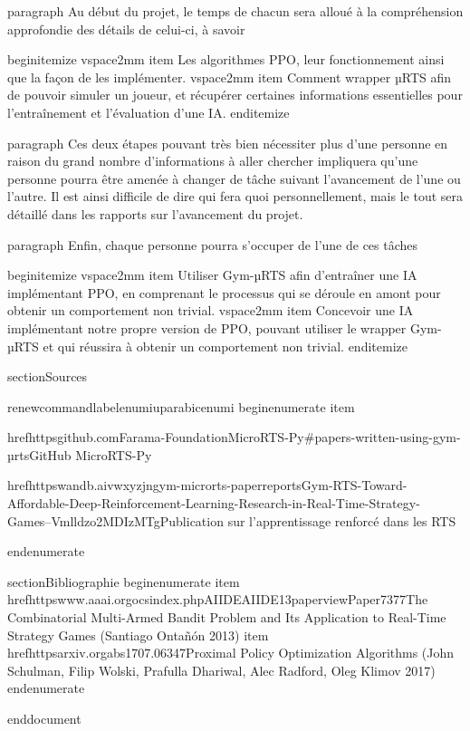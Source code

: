 	paragraph{}
	Au début du projet, le temps de chacun sera alloué à la compréhension approfondie des détails de celui-ci, à savoir 
	
	begin{itemize}
		vspace{2mm}
		item Les algorithmes PPO, leur fonctionnement ainsi que la façon de les implémenter.
		vspace{2mm}
		item Comment wrapper µRTS afin de pouvoir simuler un joueur, et récupérer certaines informations essentielles pour l'entraînement et l'évaluation d'une IA.
	end{itemize}
	
	paragraph{}
	Ces deux étapes pouvant très bien nécessiter plus d'une personne en raison du grand nombre d'informations à aller chercher impliquera qu'une personne pourra être amenée à changer de tâche suivant l'avancement de l'une ou l'autre. Il est ainsi difficile de dire qui fera quoi personnellement, mais le tout sera détaillé dans les rapports sur l'avancement du projet.
	
	paragraph{}
	Enfin, chaque personne pourra s'occuper de l'une de ces tâches 
	
	begin{itemize}
		vspace{2mm}
		item Utiliser Gym-µRTS afin d'entraîner une IA implémentant PPO, en comprenant le processus qui se déroule en amont pour obtenir un comportement non trivial.
		vspace{2mm}
		item Concevoir une IA implémentant notre propre version de PPO, pouvant utiliser le wrapper Gym-µRTS et qui réussira à obtenir un comportement non trivial.
	end{itemize}
	
	section{Sources}
	
	renewcommand{labelenumi}{up{arabic{enumi}}}
	begin{enumerate}
		item{
			href{httpsgithub.comFarama-FoundationMicroRTS-Py#papers-written-using-gym-µrts}{GitHub MicroRTS-Py}
			
			href{httpswandb.aivwxyzjngym-microrts-paperreportsGym-RTS-Toward-Affordable-Deep-Reinforcement-Learning-Research-in-Real-Time-Strategy-Games--Vmlldzo2MDIzMTg}{Publication sur l'apprentissage renforcé dans les RTS}    
		}
	end{enumerate}
	
	section{Bibliographie}
	begin{enumerate}
		item{
			href{httpswww.aaai.orgocsindex.phpAIIDEAIIDE13paperviewPaper7377}{The Combinatorial Multi-Armed Bandit Problem and Its Application to Real-Time Strategy Games (Santiago Ontañón 2013)}
		}
		item{
			href{httpsarxiv.orgabs1707.06347}{Proximal Policy Optimization Algorithms (John Schulman, Filip Wolski, Prafulla Dhariwal, Alec Radford, Oleg Klimov 2017)}
		}
	end{enumerate}
	
	
end{document}
